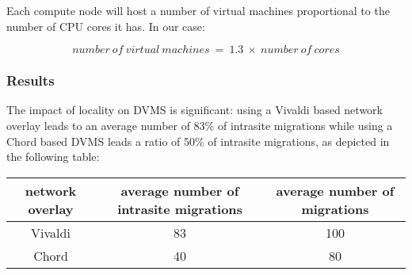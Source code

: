 Each compute node will host a number of virtual machines proportional to the 
number of CPU cores it has. In our case:

\[
	number\ of\ virtual\ machines\ =\ 1.3\ \times\ number\ of\ cores
\]

\subsubsection{Results}

The impact of locality on DVMS is significant: using a Vivaldi based network
overlay leads to an average number of 83\% of intrasite migrations while using 
a Chord based DVMS leads a ratio of 50\% of intrasite migrations, as depicted
in the following table:

\begin{tabular}{|c|c|c|}
  
  \hline
  network overlay & \multicolumn{1}{|p{3cm}|}{\centering average number of intrasite migrations}  & \multicolumn{1}{|p{3cm}|}{ \centering average number of migrations}  \\

  \hline
  Vivaldi & 83 & 100 \\

  \hline
  Chord & 40 & 80 \\

  \hline
\end{tabular}
\\

